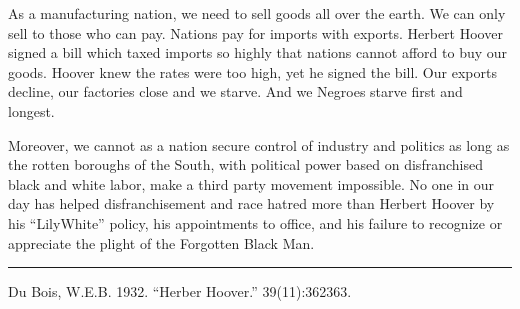 \documentclass[letterpaper,10pt,english]{jupyterBook}
\begin{document}
\sphinxAtStartPar
As a manufacturing nation, we need to sell goods all over the earth. We can only sell to those who can pay. Nations pay for imports with exports. Herbert Hoover signed a bill which taxed imports so highly that nations cannot afford to buy our goods. Hoover knew the rates were too high, yet he signed the bill. Our exports decline, our factories close and we starve. And we Negroes starve first and longest.

\sphinxAtStartPar
Moreover, we cannot as a nation secure control of industry and politics as long as the rotten boroughs of the South, with political power based on disfranchised black and white labor, make a third party movement impossible. No one in our day has helped disfranchisement and race hatred more than Herbert Hoover by his “Lily\sphinxhyphen{}White” policy, his appointments to office, and his failure to recognize or appreciate the plight of the Forgotten Black Man.


\bigskip\hrule\bigskip


\sphinxAtStartPar
{} Du Bois, W.E.B. 1932. “Herber Hoover.”  39(11):362\sphinxhyphen{}363.
\end{document}
